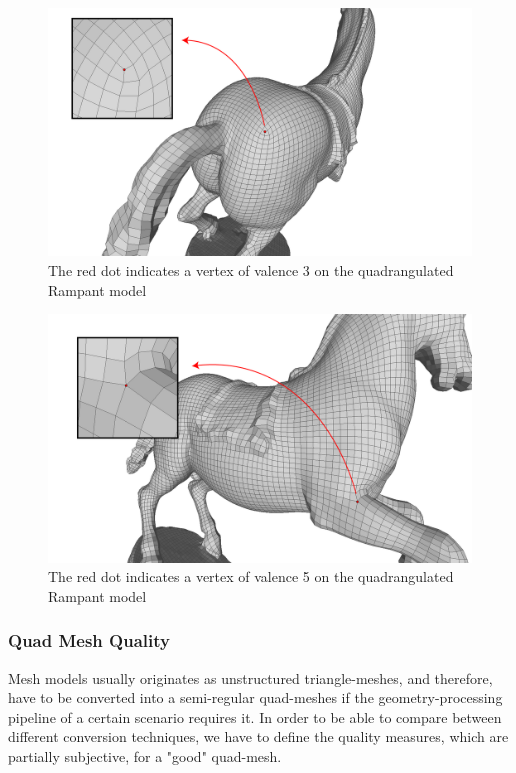 \begin{figure}[ht]
\centering
\includegraphics[width=13cm]{figures/valence_3.png}
\caption[Irregular vertex of valence 3]{The red dot indicates a vertex of valence 3 on the quadrangulated Rampant model}
\label{fig:valence_3}
\end{figure}

\begin{figure}[ht]
\centering
\includegraphics[width=13cm]{figures/valence_5.png}
\caption[Irregular vertex of valence 5]{The red dot indicates a vertex of valence 5 on the quadrangulated Rampant model}
\label{fig:valence_5}
\end{figure}

\subsubsection{Quad Mesh Quality}
Mesh models usually originates as unstructured triangle-meshes, and therefore, have to be converted into a semi-regular quad-meshes if the geometry-processing pipeline of a certain scenario requires it. In order to be able to compare between different conversion techniques, we have to define the quality measures, which are partially subjective, for a "good" quad-mesh.

